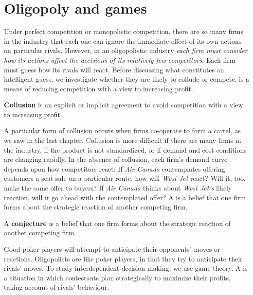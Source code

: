 \section{Oligopoly and games}\label{sec:ch11sec4}

Under perfect competition or monopolistic competition, there are so many firms in the industry that each one can ignore the immediate effect of its own actions on particular rivals. However, in an oligopolistic industry \textit{each firm must consider how its actions affect the decisions of its relatively few competitors}. Each firm must guess how its rivals will react. Before discussing what constitutes an intelligent guess, we investigate whether they are likely to collude or compete.  is a means of reducing competition with a view to increasing profit.

\begin{DefBox}
\textbf{Collusion} is an explicit or implicit agreement to avoid competition with a view to increasing profit.
\end{DefBox}

A particular form of collusion occurs when firms co-operate to form a cartel, as we saw in the last chapter. Collusion is more difficult if there are many firms in the industry, if the product is not standardized, or if demand and cost conditions are changing rapidly. In the absence of collusion, each firm's demand curve depends upon how competitors react: If \textit{Air Canada} contemplates offering customers a seat sale on a particular route, how will \textit{West Jet} react? Will it, too, make the same offer to buyers? If \textit{Air Canada} thinks about \textit{West Jet's} likely reaction, will it go ahead with the contemplated offer? A  is a belief that one firm forms about the strategic reaction of another competing firm.

\begin{DefBox}
A \textbf{conjecture} is a belief that one firm forms about the strategic reaction of another competing firm.
\end{DefBox}

Good poker players will attempt to anticipate their opponents' moves or reactions. Oligopolists are like poker players, in that they try to anticipate their rivals' moves. To study interdependent decision making, we use game theory. A  is a situation in which contestants plan strategically to maximize their profits, taking account of rivals' behaviour.

